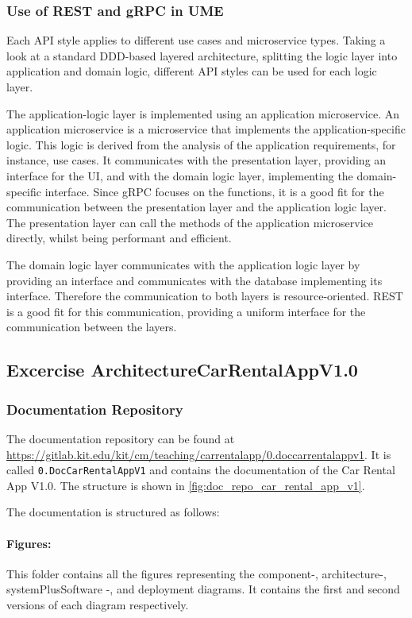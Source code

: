 \subsubsection*{Use of REST and gRPC in UME}
Each API style applies to different use cases and microservice types.
Taking a look at a standard DDD-based layered architecture, splitting the logic layer into application and domain logic, different API styles can be used for each logic layer.

The application-logic layer is implemented using an application microservice.
An application microservice is a microservice that implements the application-specific logic.
This logic is derived from the analysis of the application requirements, for instance, use cases.
It communicates with the presentation layer, providing an interface for the UI, and with the domain logic layer, implementing the domain-specific interface.
Since gRPC focuses on the functions, it is a good fit for the communication between the presentation layer and the application logic layer.
The presentation layer can call the methods of the application microservice directly, whilst being performant and efficient.

The domain logic layer communicates with the application logic layer by providing an interface and communicates with the database implementing its interface.
Therefore the communication to both layers is resource-oriented.
REST is a good fit for this communication, providing a uniform interface for the communication between the layers.

\subsection{Excercise ArchitectureCarRentalAppV1.0}
\label{sec:architecture_car_rental_app_v1_0}
\subsubsection*{Documentation Repository}
The documentation repository can be found at \url{https://gitlab.kit.edu/kit/cm/teaching/carrentalapp/0.doccarrentalappv1}.
It is called \texttt{0.DocCarRentalAppV1} and contains the documentation of the Car Rental App V1.0.
The structure is shown in \autoref{fig:doc_repo_car_rental_app_v1}.

The documentation is structured as follows:
\paragraph*{Figures:}
This folder contains all the figures representing the component-, architecture-, systemPlusSoftware -, and deployment diagrams.
It contains the first and second versions of each diagram respectively.
